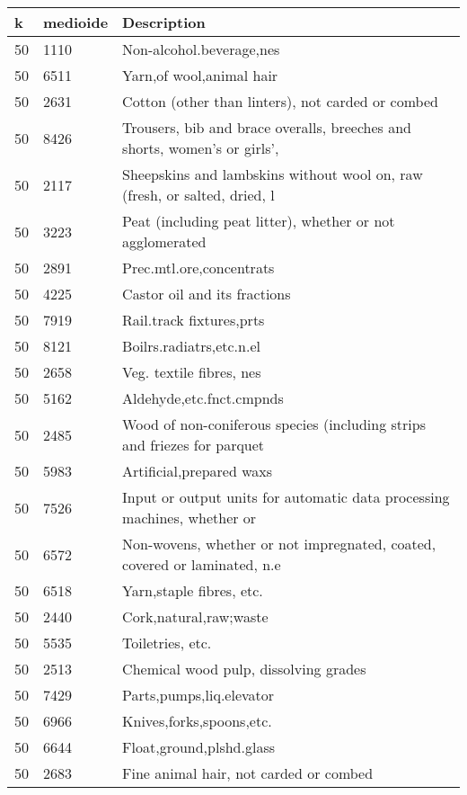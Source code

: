 \documentclass[class=article, crop=false]{standalone}
\begin{document}
\begin{table}[ht]
	\centering
	\begin{tabular}{lll}
		\hline
		k & medioide & Description \\ 
		\hline
		50 & 1110 & Non-alcohol.beverage,nes \\ 
		50 & 6511 & Yarn,of wool,animal hair \\ 
		50 & 2631 & Cotton (other than linters), not carded or combed \\ 
		50 & 8426 & Trousers, bib and brace overalls, breeches and shorts, women's or girls', \\ 
		50 & 2117 & Sheepskins and lambskins without wool on, raw (fresh, or salted, dried, l \\ 
		50 & 3223 & Peat (including peat litter), whether or not agglomerated \\ 
		50 & 2891 & Prec.mtl.ore,concentrats \\ 
		50 & 4225 & Castor oil and its fractions \\ 
		50 & 7919 & Rail.track fixtures,prts \\ 
		50 & 8121 & Boilrs.radiatrs,etc.n.el \\ 
		50 & 2658 & Veg. textile fibres, nes \\ 
		50 & 5162 & Aldehyde,etc.fnct.cmpnds \\ 
		50 & 2485 & Wood of non-coniferous species (including strips and friezes for parquet \\ 
		50 & 5983 & Artificial,prepared waxs \\ 
		50 & 7526 & Input or output units for automatic data processing machines, whether or \\ 
		50 & 6572 & Non-wovens, whether or not impregnated, coated, covered or laminated, n.e \\ 
		50 & 6518 & Yarn,staple fibres, etc. \\ 
		50 & 2440 & Cork,natural,raw;waste \\ 
		50 & 5535 & Toiletries, etc. \\ 
		50 & 2513 & Chemical wood pulp, dissolving grades \\ 
		50 & 7429 & Parts,pumps,liq.elevator \\ 
		50 & 6966 & Knives,forks,spoons,etc. \\ 
		50 & 6644 & Float,ground,plshd.glass \\ 
		50 & 2683 & Fine animal hair, not carded or combed \\ 

\end{tabular}
\end{table}
\end{document}
